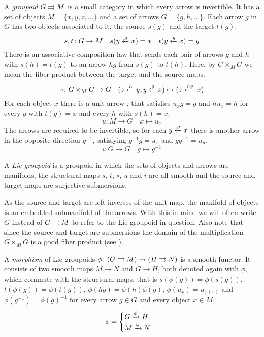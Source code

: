 %
%

A \emph{groupoid} $G\rightrightarrows M$ is a small category in which every arrow is invertible.
It has a set of objects $M=\{x,y,z,\dots\}$ and a set of arrows $G=\{g,h,\dots\}$.
Each arrow $g$ in $G$ has two objects associated to it, the source $s(g)$ and the target $t(g)$.
\[ s,t\colon G\to M  \quad s(y\xleftarrow{g} x) = x  \quad t(y\xleftarrow{g} x) = y \]
There is an associative composition law that sends each pair of arrows $g$ and $h$ with $s(h) = t(g)$ to an arrow $hg$ from $s(g)$ to $t(h)$.
Here, by $G\times_M G$ we mean the fiber product between the target and the source maps.
\[ \circ\colon G\times_M G \to G \quad (z\xleftarrow{h}y, y\xleftarrow{g}x) \mapsto (z\xleftarrow{hg}x) \]
For each object $x$ there is a unit arrow , that satisfies $u_x g = g$ and $h u_x = h$ for every $g$ with $t(g) = x$ and every $h$ with $s(h) = x$.
\[ u\colon M \to G \quad x \mapsto u_x \]
The arrows are required to be invertible, so for each $y\xleftarrow{g} x$ there is another arrow in the opposite direction $g^{-1}$, satisfying $g^{-1}g = u_x$ and $gg^{-1} = u_y$.
\[ i\colon G \to G \quad g \mapsto g^{-1} \]

A \emph{Lie groupoid} is a groupoid in which the sets of objects and arrows are manifolds, the structural maps $s$, $t$, $\circ$, $u$ and $i$ are all smooth and the source and target maps are surjective submersions.

As the source and target are left inverses of the unit map, the manifold of objects is an embedded submanifold of the arrows.
With this in mind we will often write $G$ instead of $G\rightrightarrows M$ to refer to the Lie groupoid in question.
Also note that since the source and target are submersions the domain of the multiplication $G\times_M G$ is a good fiber product (see \cite[]{dh13}).

A \emph{morphism} of Lie groupoids $\phi\colon (G\rightrightarrows M)\to (H\rightrightarrows N)$ is a smooth functor.
It consists of two smooth maps $M\to N$ and $G\to H$, both denoted again with $\phi$, which commute with the structural maps, that is $s(\phi(g)) = \phi(s(g))$, $t(\phi(g)) = \phi(t(g))$, $\phi(hg) = \phi(h)\phi(g)$, $\phi(u_x) = u_{\phi(x)}$ and $\phi(g^{-1}) = \phi(g)^{-1}$ for every arrow $g\in G$ and every object $x\in M$.
\[
\phi =
\begin{cases}
  G\xrightarrow{\phi} H \\
  M\xrightarrow{\phi} N
\end{cases}
\]

